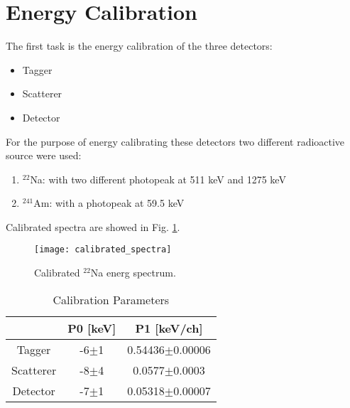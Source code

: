 \section*{Energy Calibration}

The first task is the energy calibration of the three detectors:
\begin{itemize}
\item Tagger
\item Scatterer
\item Detector
\end{itemize}
For the purpose of energy calibrating these detectors two different radioactive source were used:
\begin{enumerate}
\item $^{22}$Na: with two different photopeak at 511 keV and 1275 keV
\item $^{241}$Am: with a photopeak at 59.5 keV
\end{enumerate}

Calibrated spectra are showed in Fig. \ref{Fig: calibrated spectra}.
\begin{figure}[H]
\centering
\texttt{[image: calibrated\_spectra]}
\caption{Calibrated $^{22}$Na energ spectrum.}
\label{Fig: calibrated spectra}
\end{figure}
\begin{table}[H]
\centering
\begin{tabular}{c|cc}
\toprule
\toprule
 & P0 [keV] & P1 [keV/ch] \\
\midrule
Tagger & -6$\pm$1 &  0.54436$\pm$0.00006 \\
Scatterer & -8$\pm$4 & 0.0577$\pm$0.0003 \\
Detector & -7$\pm$1 & 0.05318$\pm$0.00007 \\
\bottomrule
\bottomrule
\end{tabular}
\caption{Calibration Parameters}
\label{Tab: Calibration parameters}
\end{table}